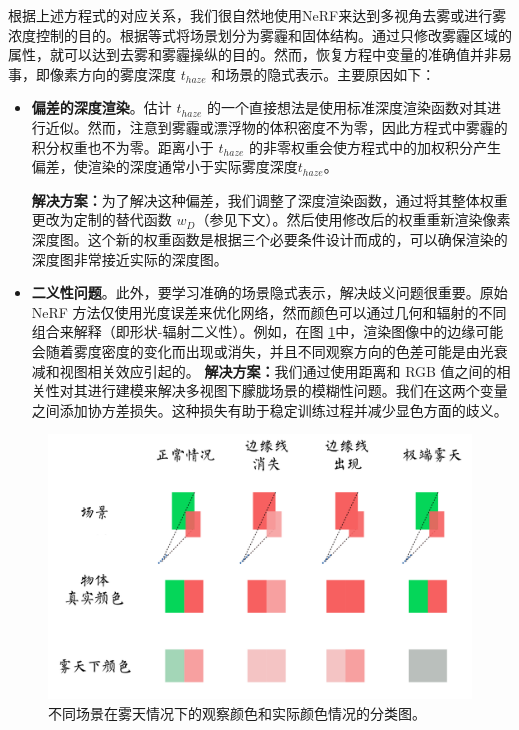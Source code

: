 根据上述方程式的对应关系，我们很自然地使用NeRF来达到多视角去雾或进行雾浓度控制的目的。根据等式将场景划分为雾霾和固体结构。通过只修改雾霾区域的属性，就可以达到去雾和雾霾操纵的目的。然而，恢复方程中变量的准确值并非易事，即像素方向的雾度深度 $t_{haze}$ 和场景的隐式表示。主要原因如下：
\begin{itemize}
    \item \textbf{偏差的深度渲染}。估计 $t_{haze}$ 的一个直接想法是使用标准深度渲染函数对其进行近似。然而，注意到雾霾或漂浮物的体积密度不为零，因此方程式中雾霾的积分权重也不为零。距离小于 $t_{haze}$ 的非零权重会使方程式中的加权积分产生偏差，使渲染的深度通常小于实际雾度深度$t_{haze}$。
    
    \textbf{解决方案：}为了解决这种偏差，我们调整了深度渲染函数，通过将其整体权重更改为定制的替代函数 $w_D$（参见下文）。然后使用修改后的权重重新渲染像素深度图。这个新的权重函数是根据三个必要条件设计而成的，可以确保渲染的深度图非常接近实际的深度图。
    \item \textbf{二义性问题}。此外，要学习准确的场景隐式表示，解决歧义问题很重要。原始 NeRF 方法仅使用光度误差来优化网络，然而颜色可以通过几何和辐射的不同组合来解释（即形状-辐射二义性\cite{zhang_nerf_2020}）。例如，在图 \ref{fig:dehazing-nerf taxonomy}中，渲染图像中的边缘可能会随着雾度密度的变化而出现或消失，并且不同观察方向的色差可能是由光衰减和视图相关效应引起的。
    \textbf{解决方案：}我们通过使用距离和 RGB 值之间的相关性对其进行建模来解决多视图下朦胧场景的模糊性问题。我们在这两个变量之间添加协方差损失。这种损失有助于稳定训练过程并减少显色方面的歧义。
\end{itemize}

\begin{figure}[ht]
    \centering
    \includegraphics[width=\textwidth]{undergraduate-thesis/images/dehazing-nerf/taxonomy.pdf}
    \caption{不同场景在雾天情况下的观察颜色和实际颜色情况的分类图。}
    \label{fig:dehazing-nerf taxonomy}
\end{figure}

